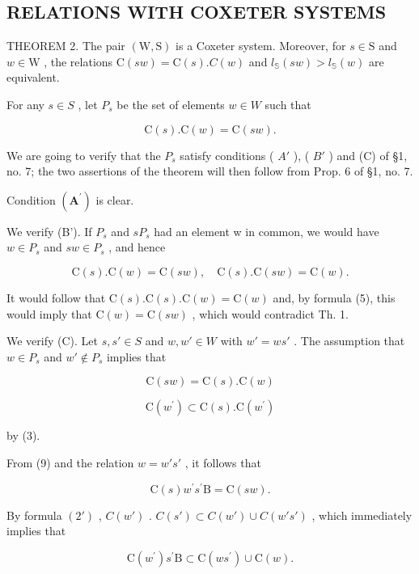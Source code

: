 \subsection{RELATIONS WITH COXETER SYSTEMS}

THEOREM 2. The pair \((\mathrm{W},\mathrm{S})\) is a Coxeter system. Moreover, for \(s\in \mathrm{S}\) and \(w\in \mathrm{W}\) , the relations \(\mathrm{C}(sw) = \mathrm{C}(s).C(w)\) and \(l_{\mathbb{S}}(sw) > l_{\mathbb{S}}(w)\) are equivalent.

For any \(s \in S\) , let \(P_s\) be the set of elements \(w \in W\) such that

\[
\mathrm{C} (s). \mathrm{C} (w) = \mathrm{C} (s w).
\]

We are going to verify that the \(P_{s}\) satisfy conditions ( \(A'\) ), ( \(B'\) ) and (C) of §1, no. 7; the two assertions of the theorem will then follow from Prop. 6 of §1, no. 7.

Condition \((\mathbf{A}^{\prime})\) is clear.

We verify (B'). If \(P_{s}\) and \(sP_{s}\) had an element w in common, we would have \(w \in P_{s}\) and \(sw \in P_{s}\) , and hence

\[
\mathrm{C} (s). \mathrm{C} (w) = \mathrm{C} (s w), \quad \mathrm{C} (s). \mathrm{C} (s w) = \mathrm{C} (w).
\]

It would follow that \(\mathrm{C}(s).\mathrm{C}(s).\mathrm{C}(w) = \mathrm{C}(w)\) and, by formula (5), this would imply that \(\mathrm{C}(w) = \mathrm{C}(sw)\) , which would contradict Th. 1.

We verify (C). Let \(s, s' \in S\) and \(w, w' \in W\) with \(w' = ws'\) . The assumption that \(w \in P_s\) and \(w' \notin P_s\) implies that

\[
\mathrm{C} (s w) = \mathrm{C} (s). \mathrm{C} (w)\tag{9}
\]

\[
\mathrm{C} (w ^ {\prime}) \subset \mathrm{C} (s). \mathrm{C} (w ^ {\prime})\tag{10}
\]

by (3).

From (9) and the relation \(w = w's'\) , it follows that

\[
\mathrm{C} (s) w ^ {\prime} s ^ {\prime} \mathrm{B} = \mathrm{C} (s w).\tag{11}
\]

By formula \((2')\) , \(C(w')\) . \(C(s') \subset C(w') \cup C(w's')\) , which immediately implies that

\[
\mathrm{C} (w ^ {\prime}) s ^ {\prime} \mathrm{B} \subset \mathrm{C} (w s ^ {\prime}) \cup \mathrm{C} (w).\tag{12}
\]

